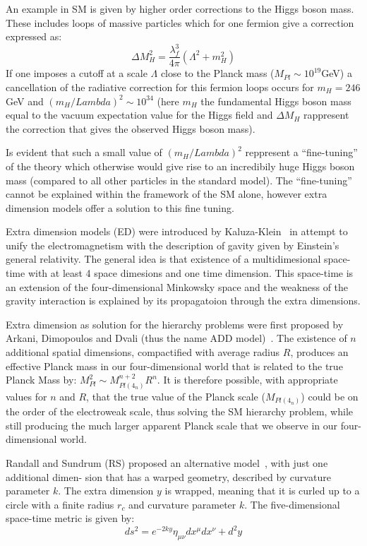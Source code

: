 An example in SM is given by higher order corrections to the Higgs boson mass. These includes loops of
massive particles which for one fermion give a correction expressed as:
\[
  \Delta M_H^2 = \frac{\lambda_f^3}{4\pi}(\Lambda^2 + m_H^2)
\]
If one imposes a cutoff at a scale $\Lambda$ close to the Planck mass ($M_{Pl}\sim 10^{19}$GeV) a cancellation
of the radiative correction for this fermion loops occurs for $m_H = 246$GeV and $(m_H/Lambda)^2 \sim 10^{34}$
(here $m_H$ the fundamental Higgs boson mass equal to the vacuum expectation value for the Higgs field and
$\Delta M_H$ rappresent the correction that gives the observed Higgs boson mass).

Is evident that such a small value of $(m_H/Lambda)^2$ reppresent a ``fine-tuning'' of the theory which otherwise
would give rise to an incredibily huge Higgs boson mass (compared to all other particles in the standard model).
The ``fine-tuning'' cannot be explained within the framework of the SM alone,
however extra dimension models offer a solution to this fine tuning.

Extra dimension models (ED) were introduced by Kaluza-Klein~\cite{kk} in attempt to unify the electromagnetism
with the description of gavity given by Einstein's general relativity.
The general idea is that existence of a multidimesional space-time with at least 4 space dimesions
and one time dimension. This space-time is an extension of the four-dimensional Minkowsky space and the weakness of
the gravity interaction is explained by its propagatoion through the extra dimensions.

Extra dimension as solution for the hierarchy problems were first proposed
by Arkani, Dimopoulos and Dvali (thus the name ADD model)~\cite{ADD}.
The existence of $n$ additional spatial dimensions, compactified with
average radius $R$, produces an effective Planck mass in our four-dimensional world that is related to the true
Planck Mass by: $M_{Pl}^2 \sim M_{Pl(4_n)}^{n+2}R^n$. It is therefore possible, with appropriate values for $n$
and $R$, that the true value of the Planck scale ($M_{Pl(4_n)}$) could be on the order of the electroweak scale,
thus solving the SM hierarchy problem, while still producing the much larger apparent Planck
scale that we observe in our four-dimensional world.

Randall and Sundrum (RS) proposed an alternative model~\cite{RS}, with just one additional dimen-
sion that has a warped geometry, described by curvature parameter $k$. The extra dimension $y$
is wrapped, meaning that it is curled up to a circle with a finite radius $r_c$ and curvature parameter $k$.
The five-dimensional space-time metric is given by:
\begin{equation}
  ds^2 = e^{-2ky}\eta_{\mu\nu}dx^{\mu}dx^{\nu} + d^2y 
\end{equation}
\label{eq:extra_dim_metric}

